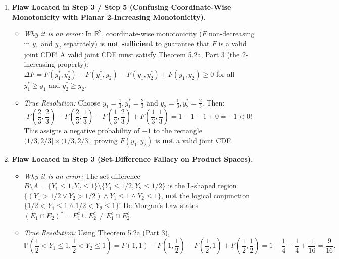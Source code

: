 \documentclass[11pt, letterpaper]{article}
\theoremstyle{definition}
\theoremstyle{remark}
\begin{document}
\begin{enumerate}[label=\textbf{Critique of Diagnostic Problem \arabic*:}, leftmargin=0pt, itemindent=0pt]
    \item \textbf{Flaw Located in Step 3 / Step 5 (Confusing Coordinate-Wise Monotonicity with Planar 2-Increasing Monotonicity).}
    \begin{itemize}
        \item \emph{Why it is an error:} In $\mathbb{R}^2$, coordinate-wise monotonicity ($F$ non-decreasing in $y_1$ and $y_2$ separately) is \textbf{not sufficient} to guarantee that $F$ is a valid joint CDF! A valid joint CDF must satisfy Theorem 5.2a, Part 3 (the 2-increasing property): $\Delta F = F(y_1^*, y_2^*) - F(y_1^*, y_2) - F(y_1, y_2^*) + F(y_1, y_2) \ge 0$ for all $y_1^* \ge y_1$ and $y_2^* \ge y_2$.
        \item \emph{True Resolution:} Choose $y_1 = \frac{1}{3}, y_1^* = \frac{2}{3}$ and $y_2 = \frac{1}{3}, y_2^* = \frac{2}{3}$. Then:
        \[
            F\!\left(\frac{2}{3}, \frac{2}{3}\right) - F\!\left(\frac{2}{3}, \frac{1}{3}\right) - F\!\left(\frac{1}{3}, \frac{2}{3}\right) + F\!\left(\frac{1}{3}, \frac{1}{3}\right) = 1 - 1 - 1 + 0 = -1 < 0!
        \]
        This assigns a negative probability of $-1$ to the rectangle $(1/3, 2/3] \times (1/3, 2/3]$, proving $F(y_1, y_2)$ is \textbf{not} a valid joint CDF.
    \end{itemize}

    \item \textbf{Flaw Located in Step 3 (Set-Difference Fallacy on Product Spaces).}
    \begin{itemize}
        \item \emph{Why it is an error:} The set difference $B \setminus A = \{Y_1 \le 1, Y_2 \le 1\} \setminus \{Y_1 \le 1/2, Y_2 \le 1/2\}$ is the L-shaped region $\{ (Y_1 > 1/2 \lor Y_2 > 1/2) \land Y_1 \le 1 \land Y_2 \le 1\}$, \textbf{not} the logical conjunction $\{1/2 < Y_1 \le 1 \land 1/2 < Y_2 \le 1\}$! De Morgan's Law states $(E_1 \cap E_2)^c = E_1^c \cup E_2^c \neq E_1^c \cap E_2^c$.
        \item \emph{True Resolution:} Using Theorem 5.2a (Part 3),
        \[
            \mathbb{P}\!\left(\frac{1}{2} < Y_1 \le 1, \frac{1}{2} < Y_2 \le 1\right) = F(1, 1) - F\!\left(1, \frac{1}{2}\right) - F\!\left(\frac{1}{2}, 1\right) + F\!\left(\frac{1}{2}, \frac{1}{2}\right) = 1 - \frac{1}{4} - \frac{1}{4} + \frac{1}{16} = \frac{9}{16}.
        \]
    \end{itemize}


\end{enumerate}
\end{document}
